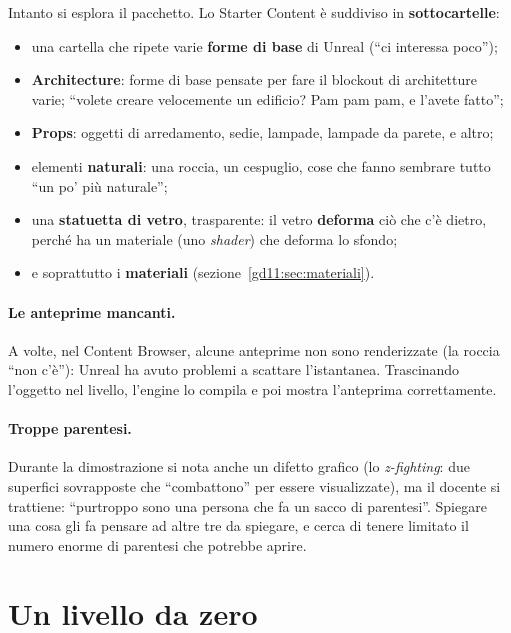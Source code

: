 Intanto si esplora il pacchetto. Lo Starter Content è suddiviso in
\textbf{sottocartelle}:
\begin{itemize}
  \item una cartella che ripete varie \textbf{forme di base} di Unreal (``ci
        interessa poco'');
  \item \textbf{Architecture}: forme di base pensate per fare il blockout di
        architetture varie; ``volete creare velocemente un edificio? Pam pam
        pam, e l'avete fatto'';
  \item \textbf{Props}: oggetti di arredamento, sedie, lampade, lampade da
        parete, e altro;
  \item elementi \textbf{naturali}: una roccia, un cespuglio, cose che fanno
        sembrare tutto ``un po' più naturale'';
  \item una \textbf{statuetta di vetro}, trasparente: il vetro
        \textbf{deforma} ciò che c'è dietro, perché ha un materiale (uno
        \emph{shader}) che deforma lo sfondo;
  \item e soprattutto i \textbf{materiali} (sezione~\ref{gd11:sec:materiali}).
\end{itemize}
\paragraph{Le anteprime mancanti.} A volte, nel Content Browser, alcune
anteprime non sono renderizzate (la roccia ``non c'è''): Unreal ha avuto
problemi a scattare l'istantanea. Trascinando l'oggetto nel livello, l'engine lo
compila e poi mostra l'anteprima correttamente.

\paragraph{Troppe parentesi.} Durante la dimostrazione si nota anche un difetto
grafico (lo \emph{z-fighting}: due superfici sovrapposte che ``combattono'' per
essere visualizzate), ma il docente si trattiene: ``purtroppo sono una persona
che fa un sacco di parentesi''. Spiegare una cosa gli fa pensare ad altre tre
da spiegare, e cerca di tenere limitato il numero enorme di parentesi che
potrebbe aprire.

\section{Un livello da zero}
\label{gd11:sec:da-zero}

